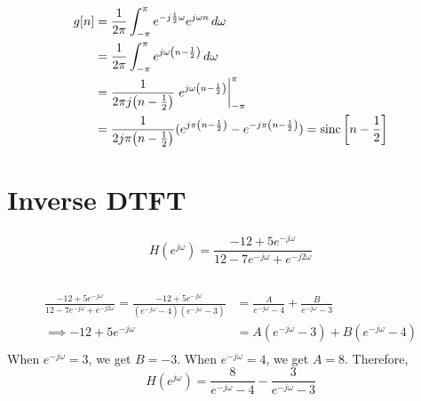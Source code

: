 \documentclass{article}
\begin{document}
\subsection{}

\begin{align}
    g[n] &= \frac{1}{2\pi} \int_{-\pi}^\pi e^{-j \frac{1}{2} \omega} e^{j \omega n} \, d\omega \\
    &= \frac{1}{2\pi} \int_{-\pi}^\pi e^{j \omega \qty(n - \frac{1}{2})} \, d\omega \\
    &= \frac{1}{2\pi j \qty(n - \frac{1}{2})} \eval{e^{j \omega \qty(n - \frac{1}{2})}}_{-\pi}^\pi \\
    &= \frac{1}{2j \pi \qty(n - \frac{1}{2})} (e^{j \pi \qty(n - \frac{1}{2})} - e^{-j \pi \qty(n - \frac{1}{2})}) = \operatorname{sinc}\qty[n - \frac{1}{2}]
\end{align}

\section{Inverse DTFT}

\begin{equation}
    H(e^{j \omega}) = \frac{-12 + 5e^{-j \omega}}{12 - 7e^{-j \omega} + e^{-j 2\omega}}
\end{equation}

\subsection{}

\begin{align}
    \frac{-12 + 5e^{-j \omega}}{12 - 7e^{-j \omega} + e^{-j 2\omega}} = \frac{-12 + 5e^{-j \omega}}{(e^{-j \omega} - 4) (e^{-j \omega} - 3)} &= \frac{A}{e^{-j \omega} - 4} + \frac{B}{e^{-j \omega} - 3} \\
    \implies -12 + 5e^{-j \omega} &= A (e^{-j \omega} - 3) + B (e^{-j \omega} - 4) \\
\end{align}
When \(e^{-j \omega} = 3\), we get \(B = -3\).
When \(e^{-j \omega} = 4\), we get \(A = 8\).
Therefore,
\begin{equation}
    H(e^{j \omega}) = \frac{8}{e^{-j \omega} - 4} - \frac{3}{e^{-j \omega} - 3}
\end{equation}

\subsection{}
\end{document}
